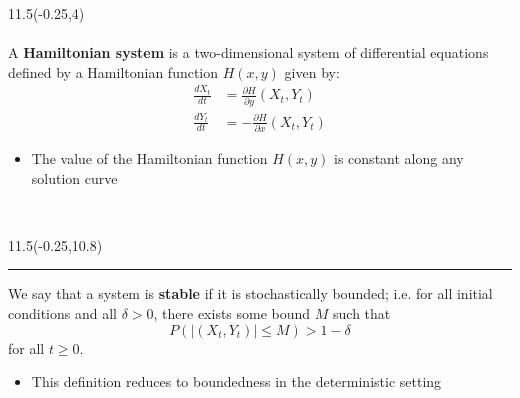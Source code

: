 \documentclass[a0]{a0poster}
\def\LHead#1{\colorbox{deepjunglegreen}{\noindent{\textbf{\Huge\color{white} #1}}\bigskip}}
\begin{document}
\begin{textblock}{11.5}(-0.25,4)
\medskip
\LHead{\parbox{11.5in}{\begin{center}Introduction\end{center}}}\\  %
\large
\qquad\\
A \textbf{Hamiltonian system} is a two-dimensional system of differential equations defined by a Hamiltonian function $H(x,y)$ given by:
\begin{align*}
\frac{dX_t}{dt} &= \frac{\partial H}{\partial y}(X_t,Y_t) \\
\frac{dY_t}{dt} &= -\frac{\partial H}{\partial x}(X_t,Y_t)
\end{align*}
\begin{itemize}
\item The value of the Hamiltonian function $H(x,y)$ is constant along any solution curve
\end{itemize}
\qquad\\

\begin{textblock}{11.5}(-0.25,10.8)
\hspace{0in}
\hrule
\end{textblock}

We say that a system is \textbf{stable} if it is stochastically bounded; i.e. for all initial conditions and all $\delta>0$, there exists some bound $M$ such that
$$P(|(X_t, Y_t)|\leq M)>1-\delta$$
for all $t\geq0$.\\
\begin{itemize}
\item This definition reduces to boundedness in the deterministic setting
\end{itemize}
\medskip
\qquad\\
\end{textblock}
\end{document}
